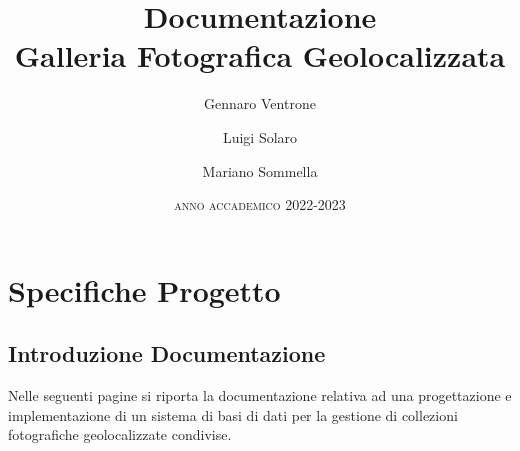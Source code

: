 \documentclass[a4paper,12pt,oneside]{book}
\title{\textrm{Documentazione\\Galleria Fotografica Geolocalizzata}}
\author{Gennaro Ventrone\and Luigi Solaro\and Mariano Sommella}
\date{\textsc{\large anno accademico 2022-2023}}
\begin{document}
    \begin{titlepage}
        \maketitle
    \end{titlepage}
        \frontmatter
        \tableofcontents
        \mainmatter

        
    \chapter{Specifiche Progetto}
    
    \section{Introduzione Documentazione}

    Nelle seguenti pagine si riporta la documentazione relativa ad una progettazione e implementazione di un sistema di basi di dati per la gestione di collezioni fotografiche geolocalizzate condivise.
    
\end{document}
